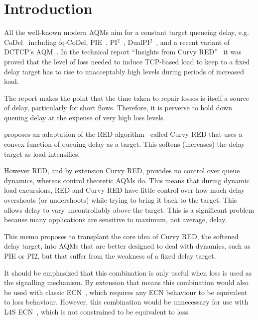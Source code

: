 
\section{Introduction}\label{softtargettr_intr}

All the well-known modern AQMs aim for a constant target queueing delay, e.g. CoDel~\cite{Nichols12:CoDel} including fq-CoDel, PIE~\cite{Pan13:PIE}, PI\(^2\)~\cite{DeSchepper16a:PI2}, DualPI\(^2\)~\cite{Briscoe15e:DualQ-Coupled-AQM_ID}, and a recent variant of DCTCP's AQM~\cite{Bai16:MQ-ECN, Bai16:ECN_GPS}. In the technical report ``Insights from Curvy RED''~\cite{Briscoe15b:CRED_Insights} it was proved that the level of loss needed to induce TCP-based load to keep to a fixed delay target has to rise to unacceptably high levels during periods of increased load.

The report makes the point that the time taken to repair losses is itself a source of delay, particularly for short flows. Therefore, it is perverse to hold down queuing delay at the expense of very high loss levels.

\cite{Briscoe15b:CRED_Insights} proposes an adaptation of the RED algorithm~\cite{Floyd93:RED} called Curvy RED that uses a convex function of queuing delay as a target. This softens (increases) the delay target as load intensifies. 

However RED, and by extension Curvy RED, provides no control over queue dynamics, whereas control theoretic AQMs do. This means that during dynamic load excursions, RED and Curvy RED have little control over how much delay overshoots (or undershoots) while trying to bring it back to the target. This allows delay to vary uncontrollably above the target. This is a significant problem because many applications are sensitive to maximum, not average, delay.

This memo proposes to transplant the core idea of Curvy RED, the softened delay target, into AQMs that are better designed to deal with dynamics, such as PIE or PI2, but that suffer from the weakness of a fixed delay target.

It should be emphasized that this combination is only useful when loss is used as the signalling mechanism. By extension that means this combination would also be used with classic ECN~\cite{IETF_RFC3168:ECN_IP_TCP}, which requires any ECN behaviour to be equivalent to loss behaviour. However, this combination would be unnecessary for use with L4S ECN~\cite{Briscoe15f:ecn-l4s-id_ID},  which is not constrained to be equivalent to loss.


